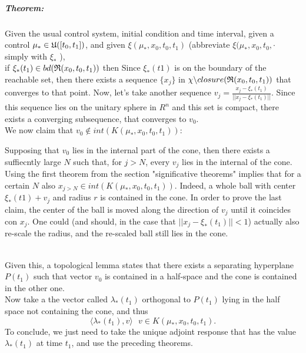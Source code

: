 \subparagraph[5.16]{Theorem:} Given the usual control system, initial condition and time interval, given a control $\mu_*\in\mathfrak{U}([t_0,t_1])$, and given $\xi(\mu_*,x_0,t_0,t_1)$ (abbreviate $\xi(\mu_*,x_0,t_0,\cdot$ simply with $\xi_*$ ),\\
if $\xi_*(t_1) \in bd(\mathfrak{R}(x_0,t_0,t_1))$ then 
 Since $\xi_*(t1)$ is on the boundary of the reachable set, then there exists a sequence $\{x_j\}$ in $\chi\backslash closure(\mathfrak{R}(x_0,t_0,t_1))$ that converges to that point. Now, let's take another sequence $v_j=\frac{x_j-\xi_*(t_1)}{||x_j-\xi_*(t_1)||}$. Since this sequence lies on the unitary sphere in $R^{n}$ and this set is compact, there exists a converging subsequence, that converges to $v_0$.\\
We now claim that $v_0\notin int(K(\mu_*,x_0,t_0,t_1))$:\\
\begin{minipage}{0.15\linewidth}
	 \mbox{}
\end{minipage}
\begin{minipage}{0.8\linewidth}
	 Supposing that $v_0$ lies in the internal part of the cone, then there exists a suffiecntly large $N$ such that, for $j>N$, every $v_j$ lies in the internal of the cone. Using the first theorem from the section "significative theorems" implies that for a certain $N$ also $x_{j>N}\in int(K(\mu_*,x_0,t_0,t_1))$. Indeed, a whole ball with center $\xi_*(t1)+v_j$ and radius $r$ is contained in the cone. In order to prove the last claim, the center of the ball is moved along the direction of $v_j$ until it coincides con $x_j$. One could (and should, in the case that $||x_j-\xi_*(t_1)||<1$) actually also re-scale the radius, and the re-scaled ball still lies in the cone. 
\end{minipage}\\
Given this, a topological lemma states that there exists a separating hyperplane $P(t_1)$ such that vector $v_0$ is contained in a half-space and the cone is contained in the other one.\\
Now take a the vector called $\lambda_*(t_1)$ orthogonal to $P(t_1)$ lying in the half space not containing the cone, and thus \[\langle \lambda_*(t_1),v\rangle\text{      }v\in K(\mu_*,x_0,t_0,t_1).\]
To conclude, we just need to take the unique adjoint response that has the value $\lambda_*(t_1)$ at time $t_1$, and use the preceding theorems. 


